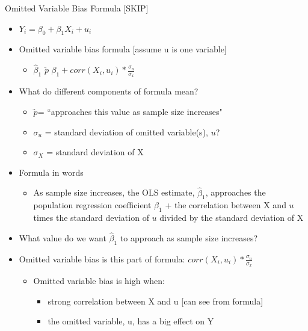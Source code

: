 \begin{frame}[shrink=10]{Omitted Variable Bias Formula [SKIP]}
	\begin{itemize}
	\item $Y_{i} = \beta_{0} + \beta_{1}X_{i} + u_{i}$
	\item Omitted variable bias formula [assume u is one variable]
		\begin{itemize}
		\item $\hat{\beta}_{1}$   $\underrightarrow{p}$   $\beta_{1} + corr(X_{i},u_{i}) * \frac{\sigma_{u}}{\sigma_{x}} $
		\end{itemize}
	\item What do different components of formula mean?
		\begin{itemize}
		\item $\underrightarrow{p}$= ``approaches this value as sample size increases"
		\item $\sigma_{u}$ = standard deviation of omitted variable(s), $u$?
		\item $\sigma_{X}$ = standard deviation of X
		\end{itemize}
	\item Formula in words
		\begin{itemize}
		\item As sample size increases, the OLS estimate, $\hat{\beta}_{1}$, approaches the population regression coefficient $\beta_{1}$ + the correlation between X and $u$ times the standard deviation of $u$ divided by the standard deviation of X
		\end{itemize}
	\item What value do we want $\hat{\beta}_{1}$ to approach as sample size increases?
	\item Omitted variable bias is this part of formula: $corr(X_{i},u_{i}) * \frac{\sigma_{u}}{\sigma_{x}} $
		\begin{itemize}
		\item Omitted variable bias is high when:
			\begin{itemize}
			\item strong correlation between X and u [can see from formula]
			\item the omitted variable, u, has a big effect on Y
			\end{itemize}
		\end{itemize}
	\end{itemize}
\end{frame}

